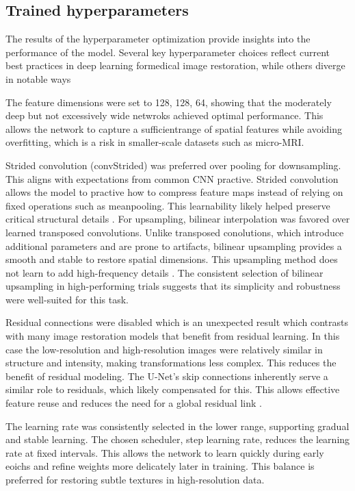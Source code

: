 \documentclass[twocolumn]{article}
\begin{document}
\subsection{Trained hyperparameters}
The results of the hyperparameter optimization provide insights into the performance of the model. 
Several key hyperparameter choices reflect current best practices in deep learning formedical image restoration, while others diverge in notable ways

The feature dimensions were set to 128, 128, 64, showing that the moderately deep but not excessively wide netwroks achieved optimal performance. 
This allows the network to capture a sufficientrange of spatial features while avoiding overfitting, which is a risk in smaller-scale datasets such as micro-MRI.

Strided convolution (convStrided) was preferred over pooling for downsampling. 
This aligns with expectations from common CNN practive. 
Strided convolution allows the model to practive how to compress feature maps instead of relying on fixed operations such as meanpooling. 
This learnability likely helped preserve critical structural details \cite{springenberg2014}.
For upsampling, bilinear interpolation was favored over learned transposed convolutions. 
Unlike transposed conolutions, which introduce additional parameters and are prone to artifacts, bilinear upsampling provides a smooth and stable to restore spatial dimensions. 
This upsampling method does not learn to add high-frequency details \cite{kolarik2019}.
The consistent selection of bilinear upsampling in high-performing trials suggests that its simplicity and robustness were well-suited for this task.
 
Residual connections were disabled which is an unexpected result which contrasts with many image restoration models that benefit from residual learning. 
In this case the low-resolution and high-resolution images were relatively similar in structure and intensity, making transformations less complex.
This reduces the benefit of residual modeling. 
The U-Net's skip connections inherently serve a similar role to residuals, which likely compensated for this. 
This allows effective feature reuse and reduces the need for a global residual link \cite{xu2024}.

The learning rate was consistently selected in the lower range, supporting gradual and stable learning. 
The chosen scheduler, step learning rate, reduces the learning rate at fixed intervals. 
This allows the network to learn quickly during early eoichs and refine weights more delicately later in training. 
This balance is preferred for restoring subtle textures in high-resolution data. 
\end{document}
